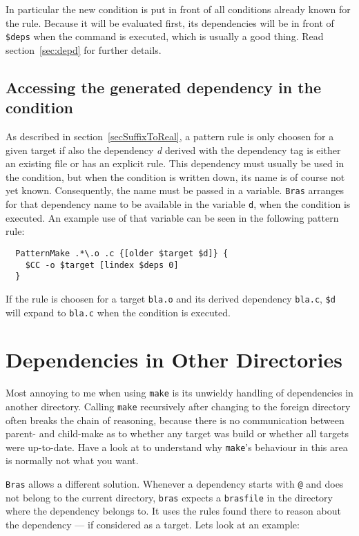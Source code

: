 \documentclass[11pt,bibtotoc,idxtotoc]{scrreprt}
\makeatletter
\newcommand{\bras}{\texttt{bras}}
\newcommand{\Bras}{\texttt{Bras}}
\newcommand{\make}{\texttt{make}}
\newcommand{\indextt}[1]{\index{#1@\texttt{#1}}}
\newcommand{\Indextt}[1]{\texttt{#1}\index{#1@\texttt{#1}}}
\makeatother
\begin{document}
In particular the new condition is put in front of all conditions
already known for the rule. Because it will be evaluated first, its
dependencies will be in front of \texttt{\$deps} \indextt{deps} when the command is
executed, which is usually a good thing. Read section~\ref{sec:depd}
for further details.
\subsection{Accessing the generated dependency in the condition}
\label{sec:depd}

As described in section~\ref{secSuffixToReal}, a pattern rule is only
choosen for a given target if also the dependency \textit{d} derived
with the dependency tag is either an existing file or has an explicit
rule. This dependency must usually be used in the condition, but when
the condition is written down, its name is of course not yet
known. Consequently, the name must be passed in a variable. \Bras{}
arranges for that dependency name to be available in the variable
\Indextt{d}, when the condition is executed. An example use of that
variable can be seen in the following pattern rule:
\begin{verbatim}
  PatternMake .*\.o .c {[older $target $d]} {
    $CC -o $target [lindex $deps 0]
  }
\end{verbatim}
If the rule is choosen for a target \texttt{bla.o} and its derived
dependency \texttt{bla.c}, \texttt{\$d} will expand to \texttt{bla.c}
when the condition is executed.


\section{Dependencies in Other Directories}
\label{secForeignDeps}

Most annoying to me when using \make{} is its unwieldy handling of
dependencies in another directory. Calling \make{} recursively after
changing to the foreign directory often breaks the chain of reasoning,
because there is no communication between parent- and child-make as to
whether any target was build or whether all targets were
up-to-date. Have a look at \cite{Mil97} to understand why \make's
behaviour in this area is normally not what you want.

\Bras{} allows a different solution. Whenever a dependency starts with
\texttt{@} and does not belong to the current
directory, \bras{} expects a \texttt{brasfile} in the directory where
the dependency belongs to. It uses the rules found there to reason
about the dependency --- if considered as a target. Lets look at an
example:
\end{document}

